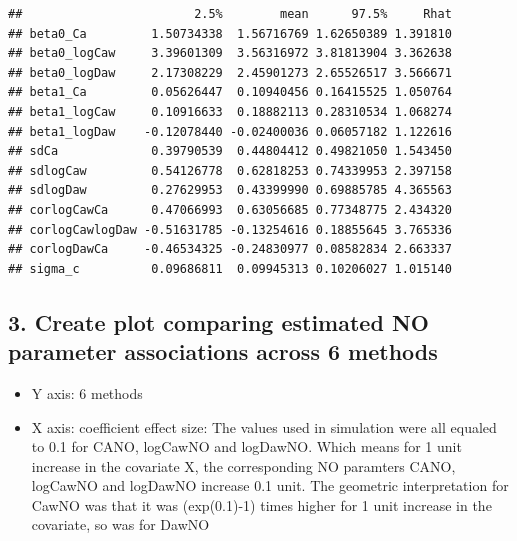 \documentclass[
]{article}
\newenvironment{Shaded}{\begin{snugshade}}{\end{snugshade}}
\newcommand{\FunctionTok}[1]{\textcolor[rgb]{0.00,0.00,0.00}{#1}}
\newcommand{\NormalTok}[1]{#1}
\newcommand{\SpecialCharTok}[1]{\textcolor[rgb]{0.00,0.00,0.00}{#1}}
\newcommand{\StringTok}[1]{\textcolor[rgb]{0.31,0.60,0.02}{#1}}
\providecommand{\tightlist}{%
  \setlength{\itemsep}{0pt}\setlength{\parskip}{0pt}}
\begin{document}
\begin{Shaded}
\end{Shaded}

\begin{verbatim}
##                        2.5%        mean      97.5%     Rhat
## beta0_Ca         1.50734338  1.56716769 1.62650389 1.391810
## beta0_logCaw     3.39601309  3.56316972 3.81813904 3.362638
## beta0_logDaw     2.17308229  2.45901273 2.65526517 3.566671
## beta1_Ca         0.05626447  0.10940456 0.16415525 1.050764
## beta1_logCaw     0.10916633  0.18882113 0.28310534 1.068274
## beta1_logDaw    -0.12078440 -0.02400036 0.06057182 1.122616
## sdCa             0.39790539  0.44804412 0.49821050 1.543450
## sdlogCaw         0.54126778  0.62818253 0.74339953 2.397158
## sdlogDaw         0.27629953  0.43399990 0.69885785 4.365563
## corlogCawCa      0.47066993  0.63056685 0.77348775 2.434320
## corlogCawlogDaw -0.51631785 -0.13254616 0.18855645 3.765336
## corlogDawCa     -0.46534325 -0.24830977 0.08582834 2.663337
## sigma_c          0.09686811  0.09945313 0.10206027 1.015140
\end{verbatim}

\hypertarget{create-plot-comparing-estimated-no-parameter-associations-across-6-methods}{%
\subsection{3. Create plot comparing estimated NO parameter associations
across 6
methods}\label{create-plot-comparing-estimated-no-parameter-associations-across-6-methods}}

\begin{itemize}
\tightlist
\item
  Y axis: 6 methods
\item
  X axis: coefficient effect size: The values used in simulation were
  all equaled to 0.1 for CANO, logCawNO and logDawNO. Which means for 1
  unit increase in the covariate X, the corresponding NO paramters CANO,
  logCawNO and logDawNO increase 0.1 unit. The geometric interpretation
  for CawNO was that it was (exp(0.1)-1) times higher for 1 unit
  increase in the covariate, so was for DawNO
\end{itemize}
\end{document}
